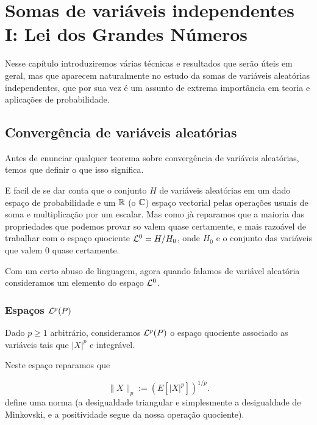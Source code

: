 
\chapter{Somas de variáveis independentes I: Lei dos Grandes Números}

Nesse capítulo introduziremos várias técnicas e resultados que serão úteis em geral, mas que aparecem naturalmente no estudo da somas de variáveis aleatórias independentes, que por sua vez é um assunto de extrema importância em teoria e aplicações de probabilidade.

\section{Convergência de variáveis aleatórias}

Antes de enunciar qualquer teorema sobre convergência de variáveis aleatórias, temos que definir o que isso significa.

\medskip

E facil de se dar conta que o conjunto $H$ de variáveis aleatórias em um dado espaço de probabilidade e um ${\mathbb R}$ (o ${\mathbb C}$) espaço vectorial pelas operações usuais de soma e  multiplicação por um escalar.
Mas como jà reparamos que a maioria das propriedades que podemos provar so valem quase certamente, e mais razoável de trabalhar com o espaço quociente  ${\mathcal L}^0=H/H_0$, onde $H_0$ e o conjunto das variáveis que valem $0$ quase certamente.

\medskip

Com um certo abuso de linguagem, 
agora quando falamos de variável aleatória consideramos um elemento do espaço ${\mathcal L}^0$. 

\subsection{Espaços ${\mathcal L}^p(P)$}

Dado $p\ge 1$ arbitrário, consideramos ${\mathcal L}^p(P)$ o espaço quociente associado as variáveis tais que $|X|^p$ e integrável.

\medskip

Neste espaço reparamos que 

$$\| X\|_p:= \left(E\left [ |X|^p \right]\right)^{1/p}.$$ 
define uma norma (a desigualdade triangular e simplesmente a desigualdade de Minkovski, e a positividade segue da nossa operação quociente).

\medskip

